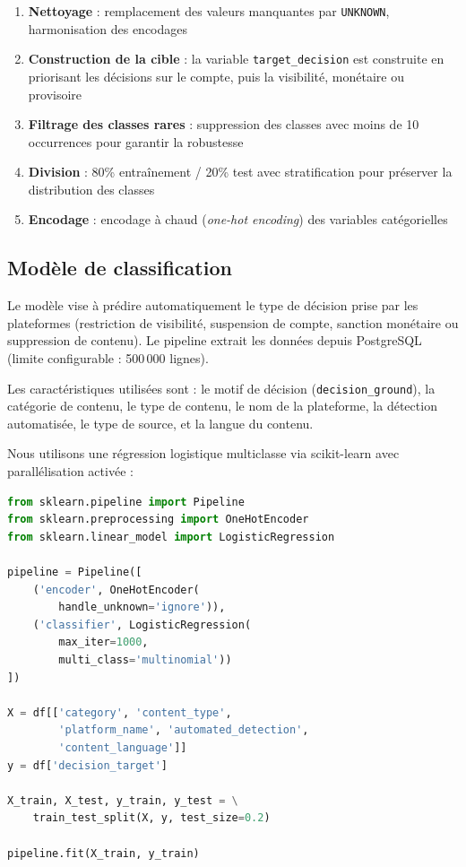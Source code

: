 \documentclass[10pt,twocolumn,a4paper]{article}
\begin{document}
\begin{enumerate}
    \item \textbf{Nettoyage} : remplacement des valeurs manquantes par \texttt{UNKNOWN}, harmonisation des encodages
    \item \textbf{Construction de la cible} : la variable \texttt{target\_decision} est construite en priorisant les décisions sur le compte, puis la visibilité, monétaire ou provisoire
    \item \textbf{Filtrage des classes rares} : suppression des classes avec moins de 10 occurrences pour garantir la robustesse
    \item \textbf{Division} : 80\% entraînement / 20\% test avec stratification pour préserver la distribution des classes
    \item \textbf{Encodage} : encodage à chaud (\textit{one-hot encoding}) des variables catégorielles
\end{enumerate}

\subsection{Modèle de classification}

Le modèle vise à prédire automatiquement le type de décision prise par les plateformes (restriction de visibilité, suspension de compte, sanction monétaire ou suppression de contenu). Le pipeline extrait les données depuis PostgreSQL (limite configurable : 500\,000 lignes).

Les caractéristiques utilisées sont : le motif de décision (\texttt{decision\_ground}), la catégorie de contenu, le type de contenu, le nom de la plateforme, la détection automatisée, le type de source, et la langue du contenu.

Nous utilisons une régression logistique multiclasse via scikit-learn \cite{sklearn} avec parallélisation activée :

\begin{lstlisting}[language=Python, caption={Pipeline d'apprentissage automatique simplifié}]
from sklearn.pipeline import Pipeline
from sklearn.preprocessing import OneHotEncoder
from sklearn.linear_model import LogisticRegression

pipeline = Pipeline([
    ('encoder', OneHotEncoder(
        handle_unknown='ignore')),
    ('classifier', LogisticRegression(
        max_iter=1000,
        multi_class='multinomial'))
])

X = df[['category', 'content_type', 
        'platform_name', 'automated_detection',
        'content_language']]
y = df['decision_target']

X_train, X_test, y_train, y_test = \
    train_test_split(X, y, test_size=0.2)

pipeline.fit(X_train, y_train)
\end{lstlisting}
\end{document}
